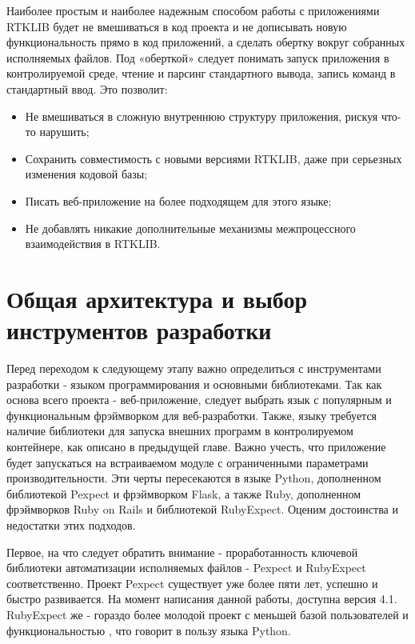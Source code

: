 Наиболее простым и наиболее надежным способом работы с приложениями RTKLIB будет не вмешиваться в код проекта и не дописывать новую функциональность прямо в код приложений, а сделать обертку вокруг собранных исполняемых файлов. Под «оберткой» следует понимать запуск приложения в контролируемой среде, чтение и парсинг стандартного вывода, запись команд в стандартный ввод. Это позволит:

\begin{itemize}
  \item Не вмешиваться в сложную внутреннюю структуру приложения, рискуя что-то нарушить;
  \item Сохранить совместимость с новыми версиями RTKLIB, даже при серьезных изменения кодовой базы;
  \item Писать веб-приложение на более подходящем для этого языке;
  \item Не добавлять никакие дополнительные механизмы межпроцессного взаимодействия в RTKLIB.
\end{itemize}


\section{Общая архитектура и выбор инструментов разработки} \label{sect2_4}

Перед переходом к следующему этапу важно определиться с инструментами разработки - языком программирования и основными библиотеками. Так как основа всего проекта - веб-приложение, следует выбрать язык с популярным и функциональным фрэймворком для веб-разработки. Также, языку требуется наличие библиотеки для запуска внешних программ в контролируемом контейнере, как описано в предыдущей главе. Важно учесть, что приложение будет запускаться на встраиваемом модуле с ограниченными параметрами производительности. Эти черты пересекаются в языке Python, дополненном библиотекой Pexpect и фрэймворком Flask, а также Ruby, дополненном фрэймворков Ruby on Rails и библиотекой RubyExpect. Оценим достоинства и недостатки этих подходов.

Первое, на что следует обратить внимание - проработанность ключевой библиотеки автоматизации исполняемых файлов - Pexpect и RubyExpect соответственно. Проект Pexpect \cite{pexpect-docs} существует уже более пяти лет, успешно и быстро развивается. На момент написания данной работы, доступна версия 4.1. RubyExpect же - гораздо более молодой проект с меньшей базой пользователей и функциональностью \cite{rubyexpect-docs}, что говорит в пользу языка Python.

